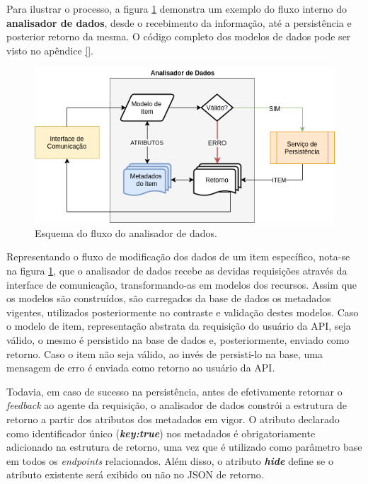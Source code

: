 \documentclass[12pt, openright, oneside, a4paper, brazil]{abntex2}
\begin{document}
Para ilustrar o processo, a figura \ref{validation_schema} demonstra um exemplo do fluxo interno do \textbf{analisador de dados}, desde o recebimento da informação, até a persistência e posterior retorno da mesma. O código completo dos modelos de dados pode ser visto no apêndice \ref{}.

\begin{figure}[h!tp]
	
	\caption{\label{validation_schema}Esquema do fluxo do analisador de dados.}

	\begin{center}
		\includegraphics[scale=0.8]{images/validation.png}
	\end{center}

	\hspace{5.5cm}{Fonte: O Autor.}

\end{figure}

Representando o fluxo de modificação dos dados de um item específico, nota-se na figura \ref{validation_schema}, que o analisador de dados recebe as devidas requisições através da interface de comunicação, transformando-as em modelos dos recursos. Assim que os modelos são construídos, são carregados da base de dados os metadados vigentes, utilizados posteriormente no contraste e validação destes modelos. Caso o modelo de item, representação abstrata da requisição do usuário da API, seja válido, o mesmo é persistido na base de dados e, posteriormente, enviado como retorno. Caso o item não seja válido, ao invés de persisti-lo na base, uma mensagem de erro é enviada como retorno ao usuário da API. 

Todavia, em caso de sucesso na persistência, antes de efetivamente retornar o \textit{feedback} ao agente da requisição, o analisador de dados constrói a estrutura de retorno a partir dos atributos dos metadados em vigor. O atributo declarado como identificador único (\textbf{\textit{key:true}}) nos metadados é obrigatoriamente adicionado na estrutura de retorno, uma vez que é utilizado como parâmetro base em todos os \textit{endpoints} relacionados. Além disso, o atributo \textbf{\textit{hide}} define se o atributo existente será exibido ou não no JSON de retorno.
\end{document}
